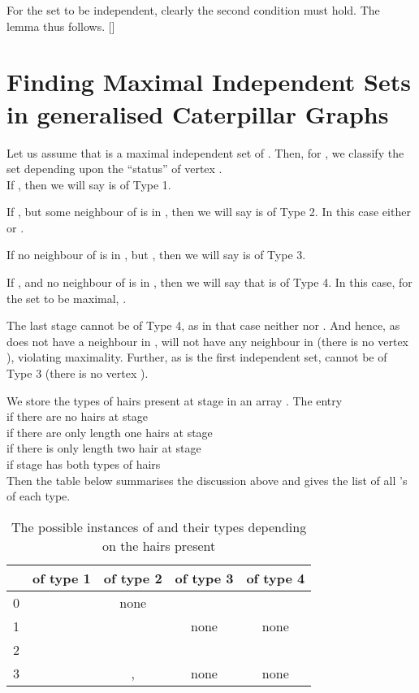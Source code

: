\documentclass[10pt]{article}
\begin{document}
For the set  to be independent, clearly the second condition must
hold. The lemma thus follows. []

\section{Finding Maximal Independent Sets in generalised Caterpillar
Graphs}

Let us assume that  is a maximal
independent set of .  
Then, for , we classify the set  depending upon the
``status'' of vertex .\\

 If , then we will say  is of Type 1.

 If , but some neighbour of  is in
, then we will say  is of Type 2. In this case either  or .

 If no neighbour of  is in , but , then we will say  is of Type 3. 

 If ,  and no
neighbour of  is in , then we will say that  is of Type 4.
In this case, for the set  to be maximal, .


The last stage  cannot be of Type 4, as in that case neither  nor . And hence, as  does not have a neighbour in
,  will not have any neighbour in  (there is no vertex
), violating maximality. Further, as  is the first
independent set,  cannot be of Type 3 (there is no vertex ).

We store the types of hairs present at stage  in an array .  The
entry \\
  if there are no hairs at stage  \\
 if there are only length one hairs at stage \\
 if there is only length two hair at stage  \\
 if stage    has both types of hairs \\

Then the table below summarises the discussion above and gives the list
of all 's of each type.
\begin{table}[h!]
\centering
\begin{tabular}{|c||c|c|c|c|}
  \hline
   	&  of type 1 	&   of type 2  & of type 3 & of type 4\\
  \hline \hline	
  0  	 	&  		&none			  	&   		&   \\
  \hline
  1  	 	&  		& 		  	& none 			& none  \\
  \hline
  2  	 	&  	& 		  	&   		&   \\
  \hline
  3  	 	&  	& ,  	& none  		& none  \\
  \hline
\end{tabular}
\caption{The possible instances of  and their types depending on the hairs present}
\end{table}
\end{document}
